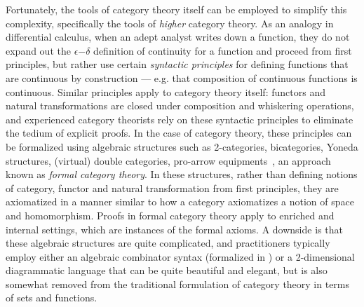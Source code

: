 \documentclass{llncs}
\begin{document}
Fortunately, the tools of category theory itself can be employed to
simplify this complexity, specifically the tools of \emph{higher}
category theory.
%
As an analogy in differential calculus, when an adept analyst writes
down a function, they do not expand out the $\epsilon\mathord{-}\delta$
definition of continuity for a function and proceed from first
principles, but rather use certain \emph{syntactic principles} for
defining functions that are continuous by construction --- e.g. that
composition of continuous functions is continuous.
%
Similar principles apply to category theory itself: functors and
natural transformations are closed under composition and whiskering
operations, and experienced category theorists rely on these syntactic
principles to eliminate the tedium of explicit proofs.
%
In the case of category theory, these principles can be formalized
using algebraic structures such as 2-categories, bicategories, Yoneda
structures, (virtual) double categories, pro-arrow
equipments~\cite{bicategories,proarrow-equipments,STREET1978350,LEINSTER2002391,Cruttwell2010},
an approach known as \emph{formal category theory}.
%
In these structures, rather than defining notions of category, functor
and natural transformation from first principles, they are axiomatized
in a manner similar to how a category axiomatizes a notion of space
and homomorphism.
%
Proofs in formal category theory apply to enriched and internal
settings, which are instances of the formal axioms.
%
A downside is that these algebraic structures are quite complicated,
and practitioners typically employ either an algebraic combinator
syntax (formalized in \citet{CURIEN1986188}) or a
2-dimensional diagrammatic language that can be quite beautiful and
elegant, but is also somewhat removed from the traditional formulation
of category theory in terms of sets and functions.
\end{document}
